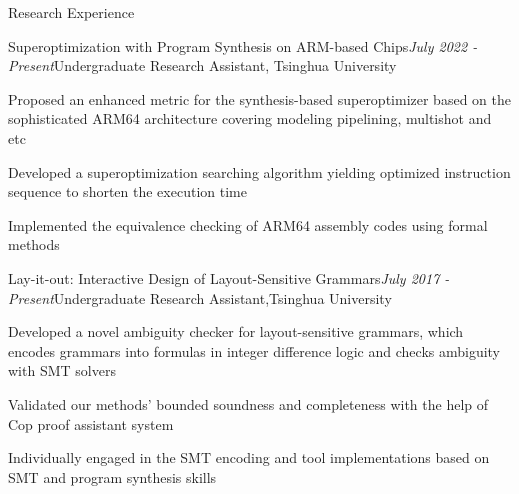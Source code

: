 \documentclass{resume} %
\newcommand{\Jul}{July }
\begin{document}
\begin{rSection}{Research Experience}
  
\begin{rSubsection}{Superoptimization with Program Synthesis on ARM-based Chips}{\em \Jul 2022 - Present}{Undergraduate Research Assistant, \textup{Tsinghua University}}{}
    
    
\item Proposed an enhanced metric for the synthesis-based superoptimizer based on the sophisticated ARM64 architecture covering modeling pipelining, multishot and etc
\item Developed a superoptimization searching algorithm yielding optimized instruction sequence to shorten the execution time
\item Implemented the equivalence checking of ARM64 assembly codes using formal methods

\end{rSubsection}



\begin{rSubsection}{Lay-it-out: Interactive Design of Layout-Sensitive Grammars}{\em \Jul 2017 - Present}{Undergraduate Research Assistant,\textup{Tsinghua University}}{}
    
\item Developed a novel ambiguity checker for layout-sensitive grammars, which encodes grammars into formulas in integer difference logic and checks ambiguity with SMT solvers
\item Validated our methods' bounded soundness and completeness with the help of Cop proof assistant system
\item Individually engaged in the SMT encoding and tool implementations based on SMT and program synthesis skills

 \end{rSubsection}
    

\end{rSection}



    
\end{document}
